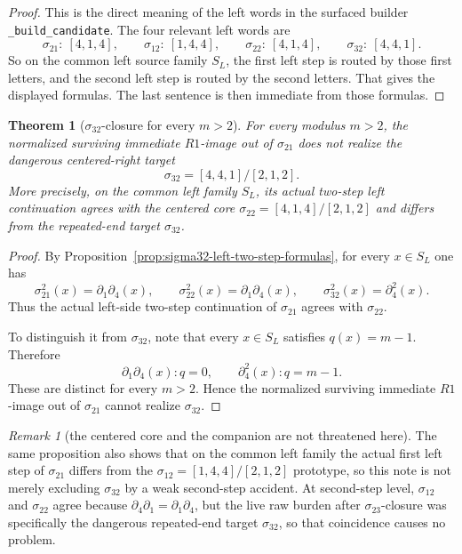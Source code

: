 \documentclass[11pt]{article}
\newtheorem{theorem}{Theorem}
\theoremstyle{remark}
\newtheorem{remark}{Remark}
\newcommand{\sig}[2]{\sigma_{#1#2}}
\newcommand{\sigA}{\sig{2}{1}}
\newcommand{\sigB}{\sig{2}{2}}
\newcommand{\sigC}{\sig{2}{3}}
\newcommand{\sigL}{\sig{1}{2}}
\newcommand{\sigR}{\sig{3}{2}}
\begin{document}
\begin{proof}
This is the direct meaning of the left words in the surfaced builder
\texttt{\_build\_candidate}.  The four relevant left words are
\[
\sigA:\ [4,1,4],\qquad
\sigL:\ [1,4,4],\qquad
\sigB:\ [4,1,4],\qquad
\sigR:\ [4,4,1].
\]
So on the common left source family \(S_L\), the first left step is routed by
those first letters, and the second left step is routed by the second letters.
That gives the displayed formulas.  The last sentence is then immediate from
those formulas.
\end{proof}

\begin{theorem}[\(\sigR\)-closure for every \(m>2\)]
\label{thm:sigma32-closed-all-m-gt-2}
For every modulus \(m>2\), the normalized surviving immediate \(R1\)-image out of
\(\sigA\) does not realize the dangerous centered-right target
\[
\sigR=[4,4,1]/[2,1,2].
\]
More precisely, on the common left family \(S_L\), its actual two-step
left continuation agrees with the centered core \(\sigB=[4,1,4]/[2,1,2]\)
and differs from the repeated-end target \(\sigR\).
\end{theorem}

\begin{proof}
By Proposition~\ref{prop:sigma32-left-two-step-formulas}, for every \(x\in S_L\)
one has
\[
\sigA^2(x)=\partial_1\partial_4(x),
\qquad
\sigB^2(x)=\partial_1\partial_4(x),
\qquad
\sigR^2(x)=\partial_4^2(x).
\]
Thus the actual left-side two-step continuation of \(\sigA\) agrees with
\(\sigB\).

To distinguish it from \(\sigR\), note that every \(x\in S_L\) satisfies
\(q(x)=m-1\).  Therefore
\[
\partial_1\partial_4(x): q=0,
\qquad
\partial_4^2(x): q=m-1.
\]
These are distinct for every \(m>2\).  Hence the normalized surviving immediate
\(R1\)-image out of \(\sigA\) cannot realize \(\sigR\).
\end{proof}

\begin{remark}[the centered core and the companion are not threatened here]
The same proposition also shows that on the common left family the actual first
left step of \(\sigA\) differs from the \(\sigL=[1,4,4]/[2,1,2]\) prototype,
so this note is not merely excluding \(\sigR\) by a weak second-step accident.
At second-step level, \(\sigL\) and \(\sigB\) agree because
\(\partial_4\partial_1=\partial_1\partial_4\), but the live raw burden after
\(\sigC\)-closure was specifically the dangerous repeated-end target \(\sigR\),
so that coincidence causes no problem.
\end{remark}
\end{document}
